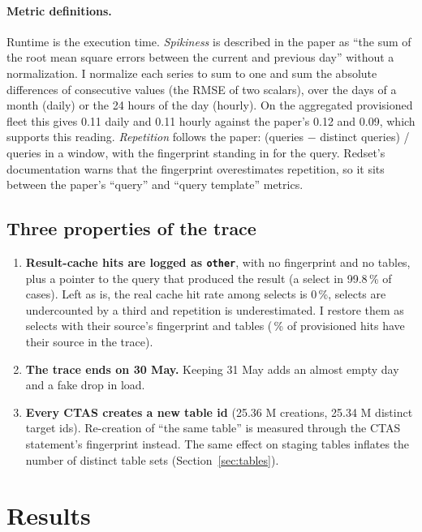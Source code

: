 \documentclass[10pt,a4paper]{article}
\begin{document}
\paragraph{Metric definitions.} Runtime is the execution time. \emph{Spikiness} is described in the paper as ``the sum of the root mean square errors between the current and previous day'' without a normalization. I normalize each series to sum to one and sum the absolute differences of consecutive values (the RMSE of two scalars), over the days of a month (daily) or the 24 hours of the day (hourly). On the aggregated provisioned fleet this gives 0.11 daily and 0.11 hourly against the paper's 0.12 and 0.09, which supports this reading. \emph{Repetition} follows the paper: (queries $-$ distinct queries) / queries in a window, with the fingerprint standing in for the query. Redset's documentation warns that the fingerprint overestimates repetition, so it sits between the paper's ``query'' and ``query template'' metrics.

\subsection{Three properties of the trace}\label{sec:traps}
\begin{enumerate}\setlength{\itemsep}{0pt}
\item \textbf{Result-cache hits are logged as \texttt{other}}, with no fingerprint and no tables, plus a pointer to the query that produced the result (a select in 99.8\,\% of cases). Left as is, the real cache hit rate among selects is 0\,\%, selects are undercounted by a third and repetition is underestimated. I restore them as selects with their source's fingerprint and tables (\CachedRestoredProv\,\% of provisioned hits have their source in the trace).
\item \textbf{The trace ends on 30 May.} Keeping 31 May adds an almost empty day and a fake drop in load.
\item \textbf{Every CTAS creates a new table id} (25.36 M creations, 25.34 M distinct target ids). Re-creation of ``the same table'' is measured through the CTAS statement's fingerprint instead. The same effect on staging tables inflates the number of distinct table sets (Section~\ref{sec:tables}).
\end{enumerate}

\section{Results}
\end{document}
